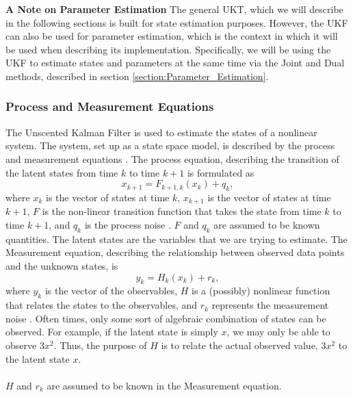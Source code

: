     \textbf{A Note on Parameter Estimation} The general UKT, which we will describe in the following sections is built for state estimation purposes. However, the UKF can also be used for parameter estimation, which is the context in which it will be used when describing its implementation. Specifically, we will be using the UKF to estimate states and parameters at the same time via the Joint and Dual methods, described in section \ref{section:Parameter_Estimation}.
    
    
    
    \subsubsection{Process and Measurement Equations}
    The Unscented Kalman Filter is used to estimate the states of a nonlinear system. The system, set up as a state space model, is described by the process and measurement equations \cite{SimonHaykinText}. The process equation, describing the transition of the latent states from time $k$ to time $k+1$ is formulated as
    \begin{equation}
    x_{k+1} = F_{k+1,k}(x_k) + q_k, 
    \end{equation}
    where $x_{k}$ is the vector of states at time $k$, $x_{k+1}$ is the vector of states at time $k+1$, $F$ is the non-linear transition function that takes the state from time $k$ to time $k+1$, and $q_k$ is the process noise \cite{SimonHaykinText}. $F$ and $q_k$ are assumed to be known quantities. The latent states are the variables that we are trying to estimate. The Measurement equation, describing the relationship between observed data points and the unknown states, is 
    \begin{equation}
    y_k = H_k(x_k) + r_k,  
    \end{equation}
    where $y_k$ is the vector of the observables, $H$ is a (possibly) nonlinear function that relates the states to the observables, and $r_k$ represents the measurement noise \cite{SimonHaykinText}. Often times, only some sort of algebraic combination of states can be observed. For example, if the latent state is simply $x$, we may only be able to observe $3x^2$. Thus, the purpose of $H$ is to relate the actual observed value, $3x^2$ to the latent state $x$.\\
    \\
    $H$ and $r_k$ are assumed to be known in the Measurement equation. 
